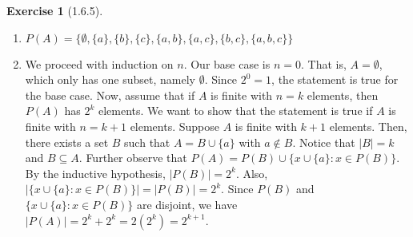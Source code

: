 \documentclass{amsart}
\theoremstyle{definition}
\newtheorem{exercise}{Exercise}
\newcommand{\abs}[1]{|#1|}
\newcommand{\card}[1]{\abs{#1}}
\newcommand{\st}{\mathrel{:}}
\begin{document}
\begin{exercise}[1.6.5]
  \begin{enumerate}[label={(\alph*)}]
    \item $P(A) = \{\emptyset, \{a\}, \{b\}, \{c\}, \{a, b\}, \{a, c\}, \{b,
      c\}, \{a, b, c\}\}$
    \item We proceed with induction on $n$. Our base case is $n = 0$. That is,
      $A = \emptyset$, which only has one subset, namely $\emptyset$. Since $2^0
      = 1$, the statement is true for the base case. Now, assume that if $A$ is
      finite with $n = k$ elements, then $P(A)$ has $2^k$ elements. We want to
      show that the statement is true if $A$ is finite with $n = k + 1$
      elements. Suppose $A$ is finite with $k + 1$ elements. Then, there exists
      a set $B$ such that $A = B \cup \{a\}$ with $a \notin B$. Notice that
      $\card{B} = k$ and $B \subseteq A$. Further observe that $P(A) = P(B) \cup
      \{x \cup \{a\} \st x \in P(B)\}$. By the inductive hypothesis,
      $\card{P(B)} = 2^k$. Also, $\card{\{x \cup \{a\} \st x \in P(B)\}} =
      \card{P(B)} = 2^k$.  Since $P(B)$ and $\{x \cup \{a\} \st x \in P(B)\}$
      are disjoint, we have $\card{P(A)} = 2^k + 2^k = 2(2^k) = 2^{k+1}$.
  \end{enumerate}
\end{exercise}
\end{document}
